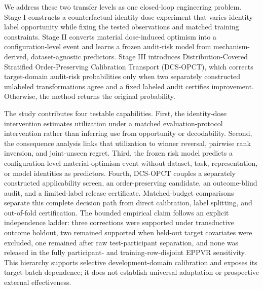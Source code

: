 \documentclass[preprint,12pt]{elsarticle}
\begin{document}
We address these two transfer levels as one closed-loop engineering problem. Stage I constructs a counterfactual identity-dose experiment that varies identity--label opportunity while fixing the tested observations and matched training constraints. Stage II converts material dose-induced optimism into a configuration-level event and learns a frozen audit-risk model from mechanism-derived, dataset-agnostic predictors. Stage III introduces Distribution-Covered Stratified Order-Preserving Calibration Transport (DCS-OPCT), which corrects target-domain audit-risk probabilities only when two separately constructed unlabeled transformations agree and a fixed labeled audit certifies improvement. Otherwise, the method returns the original probability.

The study contributes four testable capabilities. First, the identity-dose intervention estimates utilization under a matched evaluation-protocol intervention rather than inferring use from opportunity or decodability. Second, the consequence analysis links that utilization to winner reversal, pairwise rank inversion, and joint-unseen regret. Third, the frozen risk model predicts a configuration-level material-optimism event without dataset, task, representation, or model identities as predictors. Fourth, DCS-OPCT couples a separately constructed applicability screen, an order-preserving candidate, an outcome-blind audit, and a limited-label release certificate. Matched-budget comparisons separate this complete decision path from direct calibration, label splitting, and out-of-fold certification. The bounded empirical claim follows an explicit independence ladder: three corrections were supported under transductive outcome holdout, two remained supported when held-out target covariates were excluded, one remained after raw test-participant separation, and none was released in the fully participant- and training-row-disjoint EPPVR sensitivity. This hierarchy supports selective development-domain calibration and exposes its target-batch dependence; it does not establish universal adaptation or prospective external effectiveness.
\end{document}
